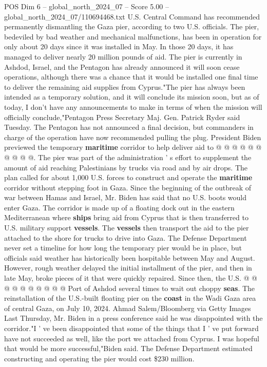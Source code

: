 \begin{textsample}{POS Dim 6 – global\_north\_2024\_07 – Score 5.00 – global\_north\_2024\_07/110694468.txt}  \label{ex:f6_pos_237}
U.S.
Central Command has recommended permanently dismantling the Gaza pier, according to two U.S. officials.
The pier, bedeviled by bad weather and mechanical malfunctions, has been in operation for only about 20 days since it was installed in May.
In those 20 days, it has managed to deliver nearly 20 million pounds of aid.
The pier is currently in Ashdod, Israel, and the Pentagon has already announced it will soon cease operations, although there was a chance that it would be installed one final time to deliver the remaining aid supplies from Cyprus."The pier has always been intended as a temporary solution, and it will conclude its mission soon, but as of today, I don't have any announcements to make in terms of when the mission will officially conclude,"Pentagon Press Secretary Maj.
Gen.
Patrick Ryder said Tuesday.
The Pentagon has not announced a final decision, but commanders in charge of the operation have now recommended pulling the plug.
President Biden previewed the temporary \textbf{maritime} corridor to help deliver aid to @ @ @ @ @ @ @ @ @ @.
The pier was part of the administration ' s effort to supplement the amount of aid reaching Palestinians by trucks via road and by air drops.
The plan called for about 1,000 U.S. forces to construct and operate the \textbf{maritime} corridor without stepping foot in Gaza.
Since the beginning of the outbreak of war between Hamas and Israel, Mr.
Biden has said that no U.S. boots would enter Gaza.
The corridor is made up of a floating dock out in the eastern Mediterranean where \textbf{ships} bring aid from Cyprus that is then transferred to U.S. military support \textbf{vessels}.
The \textbf{vessels} then transport the aid to the pier attached to the shore for trucks to drive into Gaza.
The Defense Department never set a timeline for how long the temporary pier would be in place, but officials said weather has historically been hospitable between May and August.
However, rough weather delayed the initial installment of the pier, and then in late May, broke pieces of it that were quickly repaired.
Since then, the U.S. @ @ @ @ @ @ @ @ @ @ Port of Ashdod several times to wait out choppy \textbf{seas}.
The reinstallation of the U.S.-built floating pier on the \textbf{coast} in the Wadi Gaza area of central Gaza, on July 10, 2024.
Ahmad Salem/Bloomberg via Getty Images Last Thursday, Mr.
Biden in a press conference said he was disappointed with the corridor."I ' ve been disappointed that some of the things that I ' ve put forward have not succeeded as well, like the port we attached from Cyprus.
I was hopeful that would be more successful,"Biden said.
The Defense Department estimated constructing and operating the pier would cost \$230 million.

\end{textsample}
